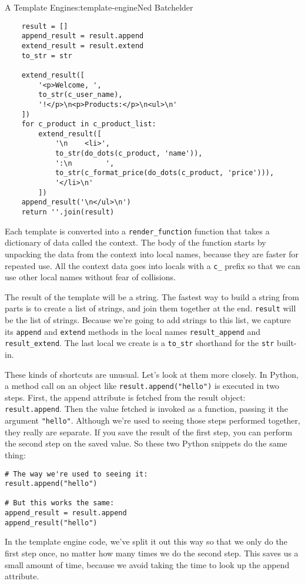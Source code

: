 \begin{aosachapter}{A Template Engine}{s:template-engine}{Ned Batchelder}
\begin{verbatim}
    result = []
    append_result = result.append
    extend_result = result.extend
    to_str = str

    extend_result([
        '<p>Welcome, ',
        to_str(c_user_name),
        '!</p>\n<p>Products:</p>\n<ul>\n'
    ])
    for c_product in c_product_list:
        extend_result([
            '\n    <li>',
            to_str(do_dots(c_product, 'name')),
            ':\n        ',
            to_str(c_format_price(do_dots(c_product, 'price'))),
            '</li>\n'
        ])
    append_result('\n</ul>\n')
    return ''.join(result)
\end{verbatim}

Each template is converted into a \texttt{render\_function} function
that takes a dictionary of data called the context. The body of the
function starts by unpacking the data from the context into local names,
because they are faster for repeated use. All the context data goes into
locals with a \texttt{c\_} prefix so that we can use other local names
without fear of collisions.

The result of the template will be a string. The fastest way to build a
string from parts is to create a list of strings, and join them together
at the end. \texttt{result} will be the list of strings. Because we're
going to add strings to this list, we capture its \texttt{append} and
\texttt{extend} methods in the local names \texttt{result\_append} and
\texttt{result\_extend}. The last local we create is a \texttt{to\_str}
shorthand for the \texttt{str} built-in.

These kinds of shortcuts are unusual. Let's look at them more closely.
In Python, a method call on an object like
\texttt{result.append("hello")} is executed in two steps. First, the
append attribute is fetched from the result object:
\texttt{result.append}. Then the value fetched is invoked as a function,
passing it the argument \texttt{"hello"}. Although we're used to seeing
those steps performed together, they really are separate. If you save
the result of the first step, you can perform the second step on the
saved value. So these two Python snippets do the same thing:

\begin{verbatim}
# The way we're used to seeing it:
result.append("hello")

# But this works the same:
append_result = result.append
append_result("hello")
\end{verbatim}

In the template engine code, we've split it out this way so that we only
do the first step once, no matter how many times we do the second step.
This saves us a small amount of time, because we avoid taking the time
to look up the append attribute.


\end{aosachapter}
